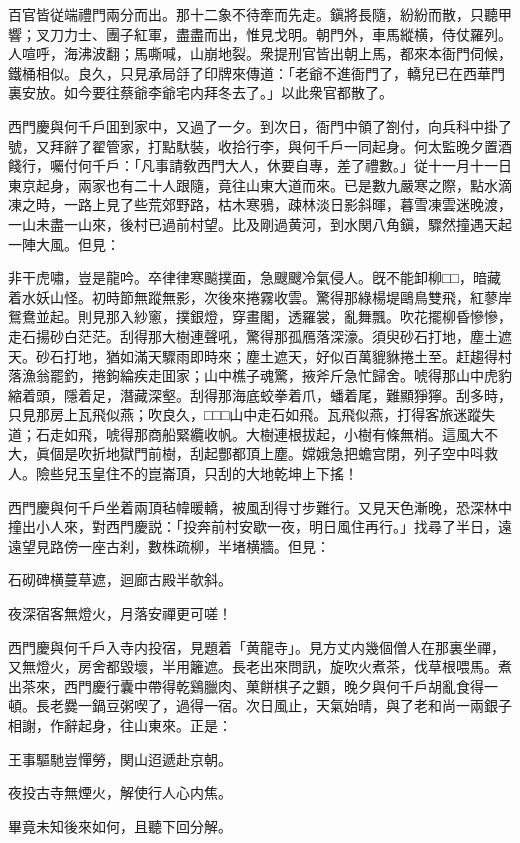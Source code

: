 百官皆従端禮門兩分而出。那十二象不待牽而先走。鎭將長隨，紛紛而散，只聽甲響；叉刀力士、團子紅軍，盡盡而出，惟見戈明。朝門外，車馬縱横，侍仗羅列。人喧呼，海沸波翻；馬嘶喊，山崩地裂。衆提刑官皆出朝上馬，都來本衙門伺候，鐵桶相似。良久，只見承局㧱了印牌來傳道：「老爺不進衙門了，轎兒已在西華門裏安放。如今要往蔡爺李爺宅内拜冬去了。」以此衆官都散了。

西門慶與何千戶囬到家中，又過了一夕。到次日，衙門中領了劄付，向兵科中掛了號，又拜辭了翟管家，打點馱裝，收拾行李，與何千戶一同起身。何太監晚夕置酒餞行，囑付何千戶：「凡事請敎西門大人，休要自專，差了禮數。」従十一月十一日東京起身，兩家也有二十人跟隨，竟往山東大道而來。已是數九嚴寒之際，點水滴凍之時，一路上見了些荒郊野路，枯木寒鴉，疎林淡日影斜暉，暮雪凍雲迷晚渡，一山未盡一山來，後村已過前村望。比及剛過黄河，到水関八角鎭，驟然撞遇天起一陣大風。但見：

\begin{myquote}
非干虎嘯，豈是龍吟。卒律律寒飈撲面，急颼颼冷氣侵人。旣不能卸柳□□，暗藏着水妖山怪。初時節無蹤無影，次後來捲霧收雲。驚得那綠楊堤鷗鳥雙飛，紅蓼岸鴛鴦並起。則見那入紗窻，撲銀燈，穿畫閣，透羅裳，亂舞飄。吹花擺柳昏慘慘，走石揚砂白茫茫。刮得那大樹連聲吼，驚得那孤鴈落深濠。須臾砂石打地，塵土遮天。砂石打地，猶如滿天驟雨即時來；塵土遮天，好似百萬貔貅捲土至。赶趨得村落漁翁罷釣，捲鉤綸疾走囬家；山中樵子魂驚，掖斧斤急忙歸舍。唬得那山中虎豹縮着頭，隱着足，潛藏深壑。刮得那海底蛟拳着爪，蟠着尾，難顯猙獰。刮多時，只見那房上瓦飛似燕；吹良久，□□□山中走石如飛。瓦飛似燕，打得客旅迷蹤失道；石走如飛，唬得那商船緊纜收帆。大樹連根拔起，小樹有條無梢。這風大不大，眞個是吹折地獄門前樹，刮起酆都頂上塵。嫦娥急把蟾宫閉，列子空中呌救人。險些兒玉皇住不的崑崙頂，只刮的大地乾坤上下搖！
\end{myquote}

西門慶與何千戶坐着兩頂毡幃暖轎，被風刮得寸步難行。又見天色漸晚，恐深林中撞出小人來，對西門慶説：「投奔前村安歇一夜，明日風住再行。」找尋了半日，遠遠望見路傍一座古刹，數株疏柳，半堵横牆。但見：

\begin{myquote}
石砌碑横蔓草遮，迴廊古殿半欹斜。

夜深宿客無燈火，月落安禪更可嗟！
\end{myquote}

西門慶與何千戶入寺内投宿，見題着「黄龍寺」。見方丈内幾個僧人在那裏坐禪，又無燈火，房舍都毀壞，半用籬遮。長老出來問訊，旋吹火煮茶，伐草根喂馬。煮出茶來，西門慶行囊中帶得乾鷄臘肉、菓餅棋子之䫫，晚夕與何千戶胡亂食得一頓。長老爨一鍋豆粥喫了，過得一宿。次日風止，天氣始晴，與了老和尚一兩銀子相謝，作辭起身，往山東來。正是：

\begin{myquote}
王事驅馳豈憚勞，関山迢遞赴京朝。

夜投古寺無煙火，解使行人心内焦。
\end{myquote}

畢竟未知後來如何，且聽下回分解。

